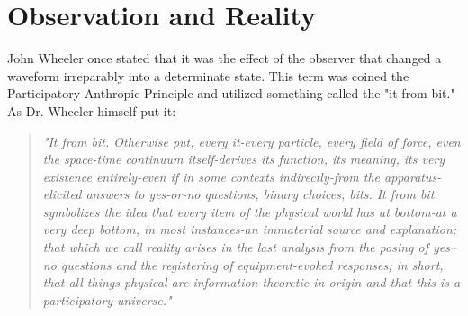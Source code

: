 \chapter{Observation and Reality}



John Wheeler once stated that it was the effect of the observer that changed a waveform irreparably into a determinate state. \cite{wheeler_it_from_bit} This term was coined the Participatory Anthropic Principle and utilized something called the "it from bit." As Dr. Wheeler himself put it:

\begin{quote}
\textit{"It from bit. \cite{collapse_foundations} Otherwise put, every it-every particle, every field of force, even the space-time continuum itself-derives its function, its meaning, its very existence entirely-even if in some contexts indirectly-from the apparatus-elicited answers to yes-or-no questions, binary choices, bits. \cite{collapse_foundations} It from bit symbolizes the idea that every item of the physical world has at bottom-at a very deep bottom, in most instances-an immaterial source and explanation; that which we call reality arises in the last analysis from the posing of yes–no questions and the registering of equipment-evoked responses; in short, that all things physical are information-theoretic in origin and that this is a participatory universe."}
\end{quote}

